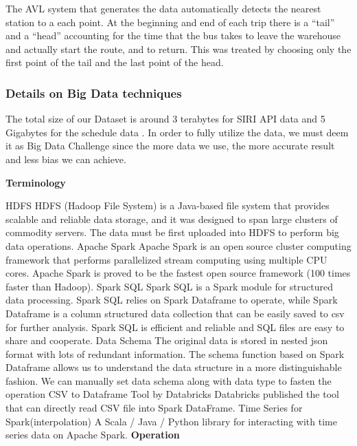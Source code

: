 \documentclass[12pt,journal,compsoc]{IEEEtran}
\begin{document}
The AVL system that generates the data automatically detects the nearest station to a each point. At the beginning and end of each trip there is a “tail” and a “head” accounting for the time that the bus takes to leave the warehouse and actually start the route, and to return. This was treated by choosing only the first point of the tail and the last point of the head.

\subsubsection{Details on Big Data techniques}

The total size of our Dataset is around 3 terabytes for SIRI API data and 5 Gigabytes for the schedule data . In order to fully utilize the data, we must deem it as Big Data Challenge since the more data we use, the more accurate result and less bias we can achieve.

\textbf{Terminology}

HDFS
HDFS (Hadoop File System) is a Java-based file system that provides scalable and reliable data storage, and it was designed to span large clusters of commodity servers.
The data must be first uploaded into HDFS to perform big data operations.
Apache Spark 
Apache Spark is an open source cluster computing framework that performs parallelized stream computing using multiple CPU cores. Apache Spark is proved to be the fastest open source framework (100 times faster than Hadoop).
Spark SQL
Spark SQL is a Spark module for structured data processing.  Spark SQL relies on Spark Dataframe to operate, while Spark Dataframe is a column structured data collection that can be easily saved to csv for further analysis. 
Spark SQL is efficient and reliable and SQL files are easy to share and cooperate.
Data Schema
The original data is stored in nested json format with lots of redundant information.
The schema function based on Spark Dataframe allows us to understand the data structure in a more distinguishable fashion.
We can manually set data schema along with data type to fasten the operation
CSV to Dataframe Tool by Databricks
Databricks published the tool that can directly read CSV file into Spark DataFrame.
Time Series for Spark(interpolation)
A Scala / Java / Python library for interacting with time series data on Apache Spark.
%
\textbf{Operation}
\end{document}
